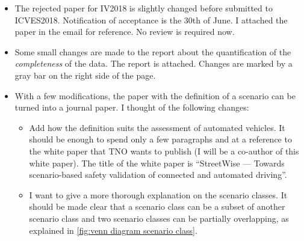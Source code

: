 \documentclass[10pt,final,a4paper,oneside,onecolumn]{article}
\newlength\venncircle\setlength{\venncircle}{10em}
\begin{document}
\begin{itemize}
	\item The rejected paper for IV2018 is slightly changed before submitted to ICVES2018. Notification of acceptance is the 30th of June. I attached the paper in the email for reference. No review is required now.
	
	\item Some small changes are made to the report about the quantification of the \emph{completeness} of the data. The report is attached. Changes are marked by a gray bar on the right side of the page.
	
	\item With a few modifications, the paper with the definition of a scenario can be turned into a journal paper. I thought of the following changes:
	\begin{itemize}
		\item Add how the definition suits the assessment of automated vehicles. It should be enough to spend only a few paragraphs and at a reference to the white paper that TNO wants to publish (I will be a co-author of this white paper). The title of the white paper is ``StreetWise --- Towards scenario-based safety validation of connected and automated driving''.		
		\item I want to give a more thorough explanation on the scenario classes. It should be made clear that a scenario class can be a subset of another scenario class and two scenario classes can be partially overlapping, as explained in \cref{fig:venn diagram scenario class}.
		\begin{figure}
			\centering
\end{figure}
\end{itemize}
\end{itemize}
\end{document}
